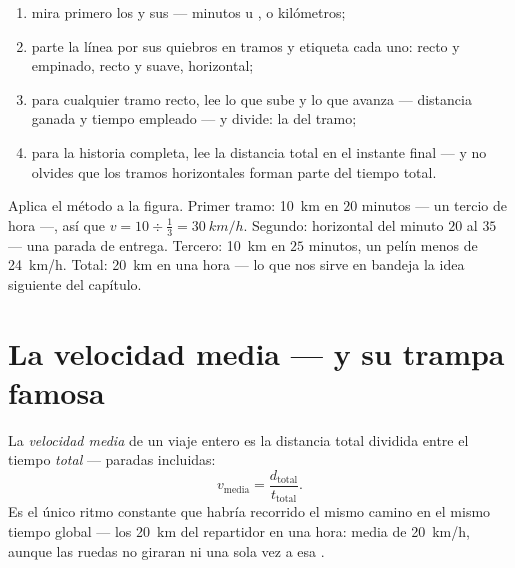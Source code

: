\begin{method}\label{met:g7:motion-average-speed:read}
\begin{enumerate}
  \item mira primero los  y sus  --- minutos u
        ,  o kilómetros;
  \item parte la línea por sus quiebros en tramos y etiqueta cada
        uno: recto y empinado, recto y suave, horizontal;
  \item para cualquier tramo recto, lee lo que sube y lo que avanza
        --- distancia ganada y tiempo empleado --- y divide: la
         del tramo;
  \item para la historia completa, lee la distancia total en el
        instante final --- y no olvides que los tramos horizontales
        forman parte del tiempo total.
\end{enumerate}
\end{method}

\begin{example}\label{ex:g7:motion-average-speed:decoded}
Aplica el método a la figura. Primer tramo: \qty{10}{km} en $20$
minutos --- un tercio de hora ---, así que $v = 10 \div \tfrac{1}{3} =
\qty{30}{km/h}$. Segundo: horizontal del minuto $20$ al $35$ --- una
parada de entrega. Tercero: \qty{10}{km} en $25$ minutos, un pelín
menos de \qty{24}{km/h}. Total: \qty{20}{km} en una hora --- lo que
nos sirve en bandeja la idea siguiente del capítulo.
\end{example}

\section{La velocidad media --- y su trampa famosa}

\begin{definition}\label{def:g7:motion-average-speed:average}
La \emph{velocidad media} de un viaje entero es
la distancia total dividida entre el tiempo \emph{total} --- paradas
incluidas:
\[
v_{\text{media}} = \frac{d_{\text{total}}}{t_{\text{total}}}.
\]
Es el único ritmo constante que habría recorrido el mismo camino en el
mismo tiempo global --- los \qty{20}{km} del repartidor en una hora:
media de \qty{20}{km/h}, aunque las ruedas no giraran ni una sola vez
a esa .
\end{definition}

